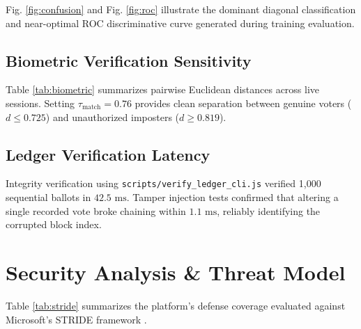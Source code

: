 \documentclass[conference]{IEEEtran}
\begin{document}
Fig. \ref{fig:confusion} and Fig. \ref{fig:roc} illustrate the dominant diagonal classification and near-optimal ROC discriminative curve generated during training evaluation.

\subsection{Biometric Verification Sensitivity}
Table \ref{tab:biometric} summarizes pairwise Euclidean distances across live sessions. Setting $\tau_{\text{match}} = 0.76$ provides clean separation between genuine voters ($d \le 0.725$) and unauthorized imposters ($d \ge 0.819$).

\begin{table}[htbp]
\caption{Pairwise Biometric Distance Calibration Across Camera Sessions}
\label{tab:biometric}
\centering
\renewcommand{\arraystretch}{1.25}
\end{table}

\subsection{Ledger Verification Latency}
Integrity verification using \texttt{scripts/verify\_ledger\_cli.js} verified 1,000 sequential ballots in $42.5\text{ ms}$. Tamper injection tests confirmed that altering a single recorded vote broke chaining within $1.1\text{ ms}$, reliably identifying the corrupted block index.

\section{Security Analysis \& Threat Model}
Table \ref{tab:stride} summarizes the platform's defense coverage evaluated against Microsoft's STRIDE framework \cite{hernan2006threat}.
\end{document}
